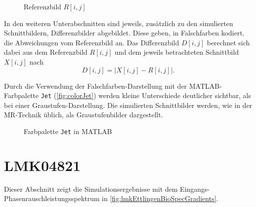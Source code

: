 \begin{figure}[H]
	\centering
	\caption[Referenzbild]{Referenzbild $R[i,j]$}
	\label{fig:R}
\end{figure}

In den weiteren Unterabschnitten sind jeweils, zusätzlich zu den simulierten Schnittbildern, Differenzbilder abgebildet. Diese geben, in Falschfarben kodiert, die Abweichungen vom Referenzbild an. Das Differenzbild $D[i,j]$ berechnet sich dabei aus dem Referenzbild $R[i,j]$ und dem jeweils betrachteten Schnittbild $X[i,j]$ nach
\begin{equation}
	D[i,j]=\left| X[i,j]-R[i,j]\right|.
\end{equation}

Durch die Verwendung der Falschfarben-Darstellung mit der MATLAB-Farbpalette \texttt{Jet} (\autoref{fig:colorJet}) werden kleine Unterschiede deutlicher sichtbar, als bei einer Graustufen-Darstellung. Die simulierten Schnittbilder werden, wie in der MR-Technik üblich, als Graustufenbilder dargestellt.
\begin{figure}[H]
	\centering
	\caption[]{Farbpalette \texttt{Jet} in MATLAB}
	\label{fig:colorJet}
\end{figure}






\clearpage
\section{LMK04821}
Dieser Abschnitt zeigt die Simulationsergebnisse mit dem Eingangs-Phasen\-rausch\-leistungs\-spektrum in \autoref{fig:lmkEttlingenBioSpecGradients}.

